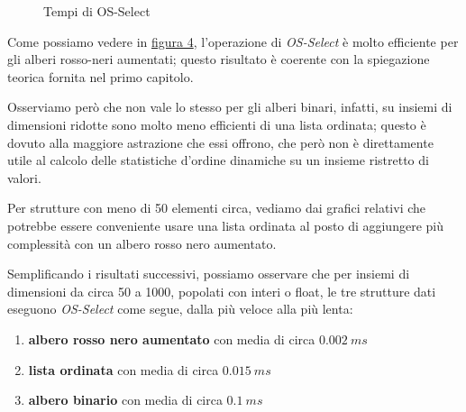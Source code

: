 \documentclass[onecolumn]{article}
\begin{document}
\begin{figure}[H]
	\caption{Tempi di OS-Select}
	\label{fig:os-select-s}
\end{figure}
\newpage

Come possiamo vedere in \hyperref[fig:os-select-s]{figura 4}, l'operazione di \textit{OS-Select} è molto efficiente per gli alberi rosso-neri aumentati; questo risultato è coerente con la spiegazione teorica fornita nel primo capitolo.

Osserviamo però che non vale lo stesso per gli alberi binari, infatti, su insiemi di dimensioni ridotte sono molto meno efficienti di una lista ordinata; questo è dovuto alla maggiore astrazione che essi offrono, che però non è direttamente utile al calcolo delle statistiche d'ordine dinamiche su un insieme ristretto di valori.

Per strutture con meno di 50 elementi circa, vediamo dai grafici relativi che potrebbe essere conveniente usare una lista ordinata al posto di aggiungere più complessità con un albero rosso nero aumentato.

Semplificando i risultati successivi, possiamo osservare che per insiemi di dimensioni da circa 50 a 1000, popolati con interi o float, le tre strutture dati eseguono \textit{OS-Select} come segue, dalla più veloce alla più lenta:

\begin{enumerate}
    \item \textbf{albero rosso nero aumentato} con media di circa \(0.002\:ms\)
    \item \textbf{lista ordinata} con media di circa \(0.015\:ms\)
    \item \textbf{albero binario} con media di circa \(0.1\:ms\)
\end{enumerate}
\end{document}
